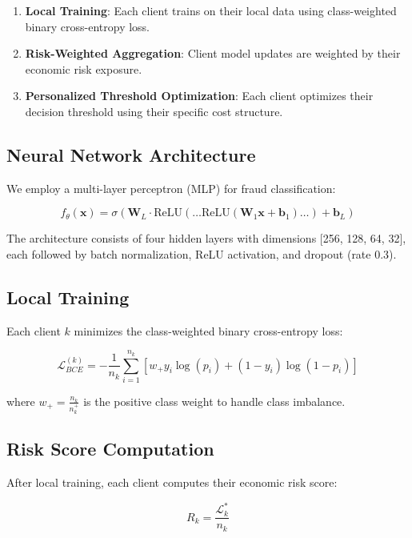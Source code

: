 \documentclass[conference]{IEEEtran}
\begin{document}
\begin{enumerate}
    \item \textbf{Local Training}: Each client trains on their local data using class-weighted binary cross-entropy loss.
    \item \textbf{Risk-Weighted Aggregation}: Client model updates are weighted by their economic risk exposure.
    \item \textbf{Personalized Threshold Optimization}: Each client optimizes their decision threshold using their specific cost structure.
\end{enumerate}

\subsection{Neural Network Architecture}

We employ a multi-layer perceptron (MLP) for fraud classification:

\begin{equation}
    f_\theta(\mathbf{x}) = \sigma(\mathbf{W}_L \cdot \text{ReLU}(\ldots \text{ReLU}(\mathbf{W}_1 \mathbf{x} + \mathbf{b}_1) \ldots) + \mathbf{b}_L)
\end{equation}

The architecture consists of four hidden layers with dimensions [256, 128, 64, 32], each followed by batch normalization, ReLU activation, and dropout (rate 0.3).

\subsection{Local Training}

Each client $k$ minimizes the class-weighted binary cross-entropy loss:

\begin{equation}
    \mathcal{L}_{BCE}^{(k)} = -\frac{1}{n_k} \sum_{i=1}^{n_k} \left[ w_+ y_i \log(p_i) + (1-y_i) \log(1-p_i) \right]
\end{equation}

where $w_+ = \frac{n_k}{n_k^+}$ is the positive class weight to handle class imbalance.

\subsection{Risk Score Computation}

After local training, each client computes their economic risk score:

\begin{equation}
    R_k = \frac{\mathcal{L}_k^*}{n_k}
    \label{eq:risk_score}
\end{equation}
\end{document}

